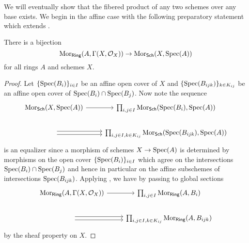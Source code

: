 We will eventually show that the fibered product of any two schemes over any base exists. We begin in the affine case with the following preparatory statement which extends .
\begin{proposition}\label{prop: maps from ring to global sections of general scheme}
    There is a bijection 
    $$\mathrm{Mor}_{\mathsf{Ring}}(A,\Gamma(X,\mathcal{O}_{X}))\to\mathrm{Mor}_{\mathsf{Sch}}(X,\operatorname{Spec}(A))$$
    for all rings $A$ and schemes $X$. 
\end{proposition}
\begin{proof}
    Let $\{\operatorname{Spec}(B_{i})\}_{i\in I}$ be an affine open cover of $X$ and $\{\operatorname{Spec}(B_{ijk})\}_{k\in K_{ij}}$ be an affine open cover of $\operatorname{Spec}(B_{i})\cap\operatorname{Spec}(B_{j})$. Now note the sequence 
    $$%
    \begin{tikzcd}
        {\Mor_{\Sch}(X,\spec(A))} & {\prod_{i,j\in I}\Mor_{\Sch}(\spec(B_{i}),\spec(A))} \\
        {} & {\prod_{i,j\in I, k\in K_{ij}}\Mor_{\Sch}(\spec(B_{ijk}),\spec(A))}
        \arrow[from=1-1, to=1-2]
        \arrow[shift left, from=2-1, to=2-2]
        \arrow[shift right, from=2-1, to=2-2]
    \end{tikzcd}$$
    is an equalizer since a morphism of schemes $X\to\operatorname{Spec}(A)$ is determined by morphisms on the open cover $\{\operatorname{Spec}(B_{i})\}_{i\in I}$ which agree on the intersections $\operatorname{Spec}(B_{i})\cap\operatorname{Spec}(B_{j})$ and hence in particular on the affine subschemes of intersections $\operatorname{Spec}(B_{ijk})$. Applying , we have by passing to global sections 
    $$%
    \begin{tikzcd}
        {\Mor_{\Ring}(A,\Gamma(X,\Ocal_{X}))} & {\prod_{i,j\in I}\Mor_{\Ring}(A,B_{i})} \\
        {} & {\prod_{i,j\in I, k\in K_{ij}}\Mor_{\Ring}(A,B_{ijk})}
        \arrow[from=1-1, to=1-2]
        \arrow[shift left, from=2-1, to=2-2]
        \arrow[shift right, from=2-1, to=2-2]
    \end{tikzcd}$$
    by the sheaf property on $X$.  
\end{proof}
